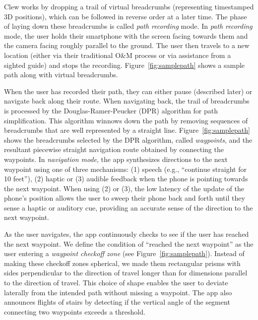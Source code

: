 \documentclass[chi_draft]{sigchi}
\newcommand{\OM}{O\&M\xspace}
\begin{document}
Clew works by dropping a trail of virtual breadcrumbs (representing timestamped 3D positions), which can be followed in reverse order at a later time.  The phase of laying down these breadcrumbs is called \emph{path recording} mode.  In \emph{path recording} mode, the user holds their smartphone with the screen facing towards them and the camera facing roughly parallel to the ground.  The user then travels to a new location (either via their traditional \OM process or via assistance from a sighted guide) and stops the recording.  Figure~\ref{fig:samplepath} shows a sample path along with virtual breadcrumbs.%
%

When the user has recorded their path, they can either pause (described later) or navigate back along their route.  When navigating back, the trail of breadcrumbs is processed by the Douglas-Ramer-Peucker (DPR) algorithm \cite{douglas1973algorithms} for path simplification.  This algorithm winnows down the path by removing sequences of breadcrumbs that are well represented by a straight line.  Figure~\ref{fig:samplepath} shows the breadcrumbs selected by the DPR algorithm, called \emph{waypoints}, and the resultant piecewise straight navigation route obtained by connecting the waypoints.  In \emph{navigation mode}, the app synthesizes directions to the next waypoint using one of three mechanisms: (1) speech (e.g., ``continue straight for 10 feet''), (2) haptic or (3) audible feedback when the phone is pointing towards the next waypoint.  When using (2) or (3), the low latency of the update of the phone's position allows the user to sweep their phone back and forth until they sense a haptic or auditory cue, providing an accurate sense of the direction to the next waypoint.

As the user navigates, the app continuously checks to see if the user has reached the next waypoint.  We define the condition of ``reached the next waypoint'' as the user entering a \emph{waypoint checkoff zone} (see Figure~\ref{fig:samplepath}).  Instead of making these checkoff zones spherical, we made them rectangular prisms with sides perpendicular to the direction of travel longer than for dimensions parallel to the direction of travel.  This choice of shape enables the user to deviate laterally from the intended path without missing a waypoint.  The app also announces flights of stairs by detecting if the vertical angle of the segment connecting two waypoints exceeds a threshold.
\end{document}
